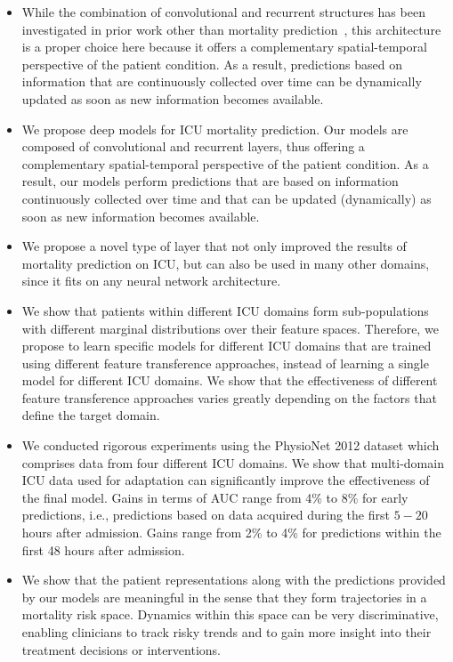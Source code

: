 \begin{itemize}
	\item While the combination of convolutional and recurrent structures has been investigated in prior work other than mortality prediction~\citep{wang}, this architecture is a proper choice here because it offers a complementary spatial-temporal perspective of the patient condition. As a result, predictions based on information that are continuously collected over time can be dynamically updated as soon as new information becomes available.
	\item We propose deep models for ICU mortality prediction. Our models are composed of convolutional and recurrent layers, thus offering a complementary spatial-temporal perspective of the patient condition. As a result, our models perform predictions that are based on information continuously collected over time and that can be updated (dynamically) as soon as new information becomes available.
	\item We propose a novel type of layer that not only improved the results of mortality prediction on ICU, but can also be used in many other domains, since it fits on any neural network architecture.
	\item We show that patients within different ICU domains form sub-populations with different marginal distributions over their feature spaces. Therefore, we propose to learn specific models for different ICU domains that are trained using different feature transference approaches, instead of learning a single model for different ICU domains. We show that the effectiveness of different feature transference approaches varies greatly depending on the factors that define the target domain.
	\item We conducted rigorous experiments using the PhysioNet 2012 dataset which comprises data from four different ICU domains. We show that multi-domain ICU data used for adaptation can significantly improve the effectiveness of the final model. Gains in terms of AUC range from 4\% to 8\% for early predictions, i.e., predictions based on data acquired during the first $5-20$ hours after admission. Gains range from 2\% to 4\% for predictions within the first 48 hours after admission.
	\item We show that the patient representations along with the predictions provided by our models are meaningful in the sense that they form trajectories in a mortality risk space. Dynamics within this space can be very discriminative, enabling clinicians to track risky trends and to gain more insight into their treatment decisions or interventions.
\end{itemize}

